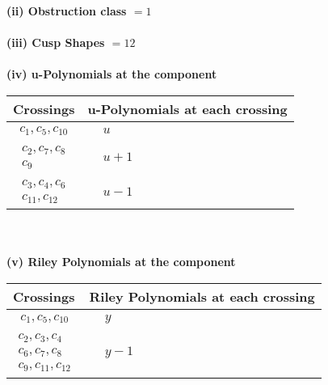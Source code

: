 \documentclass[1p]{elsarticle_modified}
\theoremstyle{definition}
\begin{document}
\flushleft \textbf{(ii) Obstruction class $= 1$}\\~\\
\flushleft \textbf{(iii) Cusp Shapes $= 12$}\\~\\
\newpage\renewcommand{\arraystretch}{1}
\flushleft \textbf{(iv) u-Polynomials at the component}\newline \\
\begin{tabular}{m{50pt}|m{274pt}}
Crossings & \hspace{64pt}u-Polynomials at each crossing \\
\hline $$\begin{aligned}c_{1},c_{5},c_{10}\end{aligned}$$&$\begin{aligned}
&u
\end{aligned}$\\
\hline $$\begin{aligned}c_{2},c_{7},c_{8}\\c_{9}\end{aligned}$$&$\begin{aligned}
&u+1
\end{aligned}$\\
\hline $$\begin{aligned}c_{3},c_{4},c_{6}\\c_{11},c_{12}\end{aligned}$$&$\begin{aligned}
&u-1
\end{aligned}$\\
\hline
\end{tabular}\\~\\
\newpage\renewcommand{\arraystretch}{1}
\flushleft \textbf{(v) Riley Polynomials at the component}\newline \\
\begin{tabular}{m{50pt}|m{274pt}}
Crossings & \hspace{64pt}Riley Polynomials at each crossing \\
\hline $$\begin{aligned}c_{1},c_{5},c_{10}\end{aligned}$$&$\begin{aligned}
&y
\end{aligned}$\\
\hline $$\begin{aligned}c_{2},c_{3},c_{4}\\c_{6},c_{7},c_{8}\\c_{9},c_{11},c_{12}\end{aligned}$$&$\begin{aligned}
&y-1
\end{aligned}$\\
\hline
\end{tabular}\\~\\
\end{document}
